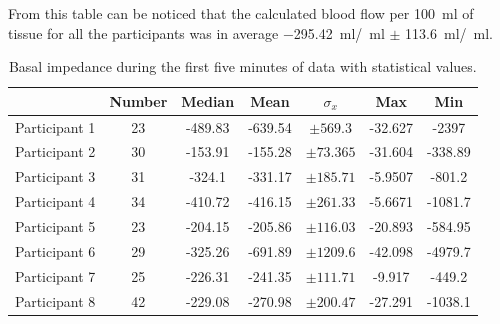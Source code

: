 From this table can be noticed that the calculated blood flow per \SI{100}{\ml} of tissue for all the participants was in average \SI{-295.42}{\ml / \ml} $\pm$ \SI{113.6}{\ml/\ml}. 

\begin{table}[t]
	\caption{Basal impedance during the first five minutes of data with statistical values.}
	\label{tbl:blood_flow:region2}
	\centering
	\begin{tabu}{lcccccc}
		\hline
		& \textbf{Number} & \textbf{Median} & \textbf{Mean} & \textbf{$\sigma_x$} & \textbf{Max} & \textbf{Min} \\\hline
		Participant 1 &       23        &     -489.83     &    -639.54    &       $\pm 569.3$        & -32.627      & -2397        \\
		Participant 2 &       30        &     -153.91     &    -155.28    &       $\pm73.365$        & -31.604      & -338.89      \\
		Participant 3 &       31        &     -324.1      &    -331.17    &       $\pm185.71$        & -5.9507      & -801.2       \\
		Participant 4 &       34        &     -410.72     &    -416.15    &       $\pm261.33$        & -5.6671      & -1081.7      \\
		Participant 5 &       23        &     -204.15     &    -205.86    &       $\pm116.03$        & -20.893      & -584.95      \\
		Participant 6 &       29        &     -325.26     &    -691.89    &       $\pm1209.6$        & -42.098      & -4979.7      \\
		Participant 7 &       25        &     -226.31     &    -241.35    &       $\pm111.71$        & -9.917       & -449.2       \\
		Participant 8 &       42        &     -229.08     &    -270.98    &       $\pm200.47$        & -27.291      & -1038.1      \\\hline
	\end{tabu} 
\end{table}


